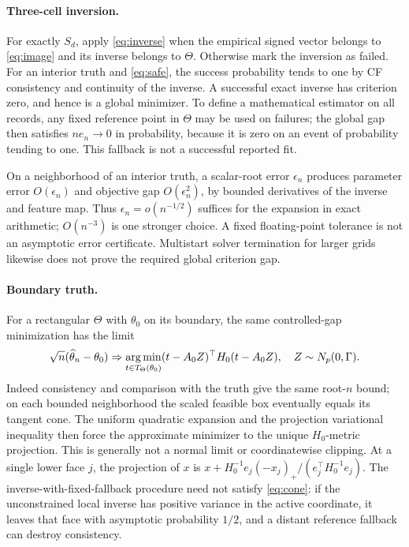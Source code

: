 \documentclass[11pt,a4paper]{article}
\theoremstyle{remark}\newtheorem{remark}[theorem]{Remark}
\begin{document}
\paragraph{Three-cell inversion.}
For exactly $S_d$, apply \eqref{eq:inverse} when the empirical signed vector belongs to \eqref{eq:image} and its inverse belongs to $\Theta$. Otherwise mark the inversion as failed. For an interior truth and \eqref{eq:safe}, the success probability tends to one by CF consistency and continuity of the inverse. A successful exact inverse has criterion zero, and hence is a global minimizer. To define a mathematical estimator on all records, any fixed reference point in $\Theta$ may be used on failures; the global gap then satisfies $ne_n\to0$ in probability, because it is zero on an event of probability tending to one. This fallback is not a successful reported fit.

On a neighborhood of an interior truth, a scalar-root error $\epsilon_n$ produces parameter error $O(\epsilon_n)$ and objective gap $O(\epsilon_n^2)$, by bounded derivatives of the inverse and feature map. Thus $\epsilon_n=o(n^{-1/2})$ suffices for the expansion in exact arithmetic; $O(n^{-3})$ is one stronger choice. A fixed floating-point tolerance is not an asymptotic error certificate. Multistart solver termination for larger grids likewise does not prove the required global criterion gap.

\paragraph{Boundary truth.}
For a rectangular $\Theta$ with $\theta_0$ on its boundary, the same controlled-gap minimization has the limit
\begin{equation}\label{eq:cone}
\sqrt n(\widehat\theta_n-\theta_0)\Rightarrow
\operatorname*{arg\,min}_{t\in T_\Theta(\theta_0)}(t-A_0Z)^\top H_0(t-A_0Z),\quad Z\sim N_p(0,\Gamma).
\end{equation}
Indeed consistency and comparison with the truth give the same root-$n$ bound; on each bounded neighborhood the scaled feasible box eventually equals its tangent cone. The uniform quadratic expansion and the projection variational inequality then force the approximate minimizer to the unique $H_0$-metric projection. This is generally not a normal limit or coordinatewise clipping. At a single lower face $j$, the projection of $x$ is
$x+H_0^{-1}e_j(-x_j)_+/(e_j^\top H_0^{-1}e_j)$.
The inverse-with-fixed-fallback procedure need not satisfy \eqref{eq:cone}: if the unconstrained local inverse has positive variance in the active coordinate, it leaves that face with asymptotic probability $1/2$, and a distant reference fallback can destroy consistency.
\end{document}
